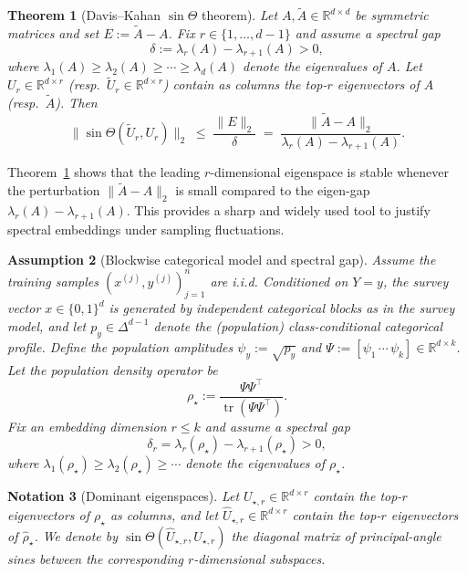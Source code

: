 \documentclass[preprint,11pt]{elsarticle}
\newtheorem{Theorem}{Theorem}[section]
\newtheorem{Notation}[Theorem]{Notation}
\newtheorem{Assumption}[Theorem]{Assumption}
\newcommand{\tr}{\operatorname{tr}}
\newcommand{\R}{\mathbb{R}}
\begin{document}
\begin{Theorem}[Davis--Kahan $\sin\Theta$ theorem]
\label{thm:davis_kahan_general}
Let $A,\widetilde A\in\R^{d\times d}$ be symmetric matrices and set $E:=\widetilde A-A$.
Fix $r\in\{1,\dots,d-1\}$ and assume a spectral gap
\[
\delta := \lambda_r(A)-\lambda_{r+1}(A) > 0,
\]
where $\lambda_1(A)\ge\lambda_2(A)\ge\cdots\ge\lambda_d(A)$ denote the eigenvalues of $A$.
Let $U_r\in\R^{d\times r}$ (resp.\ $\widetilde U_r\in\R^{d\times r}$) contain as columns the top-$r$ eigenvectors of $A$
(resp.\ $\widetilde A$). Then
\[
\bigl\|\sin\Theta(\widetilde U_r,U_r)\bigr\|_2
\;\le\;
\frac{\|E\|_2}{\delta}
\;=\;
\frac{\|\widetilde A-A\|_2}{\lambda_r(A)-\lambda_{r+1}(A)}.
\]
\end{Theorem}

Theorem~\ref{thm:davis_kahan_general} shows that the leading $r$-dimensional eigenspace is stable whenever the perturbation
$\|\widetilde A-A\|_2$ is small compared to the eigen-gap $\lambda_r(A)-\lambda_{r+1}(A)$.
This provides a sharp and widely used tool to justify spectral embeddings under sampling fluctuations.

\begin{Assumption}[Blockwise categorical model and spectral gap]
\label{ass:population_and_gap}
Assume the training samples $(x^{(j)},y^{(j)})_{j=1}^n$ are i.i.d.
Conditioned on $Y=y$, the survey vector $x\in\{0,1\}^d$ is generated by independent categorical blocks as in the survey model,
and let $p_y\in\Delta^{d-1}$ denote the (population) class-conditional categorical profile.
Define the population amplitudes $\psi_y:=\sqrt{p_y}$ and $\Psi:=[\psi_1\,\cdots\,\psi_k]\in\R^{d\times k}$.
Let the population density operator be
\[
\rho_\star := \frac{\Psi\Psi^\top}{\tr(\Psi\Psi^\top)}.
\]
Fix an embedding dimension $r\le k$ and assume a spectral gap
\[
\delta_r = \lambda_r(\rho_\star) - \lambda_{r+1}(\rho_\star) > 0,
\]
where $\lambda_1(\rho_\star)\ge\lambda_2(\rho_\star)\ge\cdots$ denote the eigenvalues of $\rho_\star$.
\end{Assumption}

\begin{Notation}[Dominant eigenspaces]
\label{not:eigenspaces}
Let $U_{\star,r}\in\R^{d\times r}$ contain the top-$r$ eigenvectors of $\rho_\star$ as columns,
and let $\widehat U_{\star,r}\in\R^{d\times r}$ contain the top-$r$ eigenvectors of $\widehat\rho_\star$.
We denote by $\sin\Theta(\widehat U_{\star,r},U_{\star,r})$ the diagonal matrix of principal-angle sines
between the corresponding $r$-dimensional subspaces.
\end{Notation}
\end{document}
